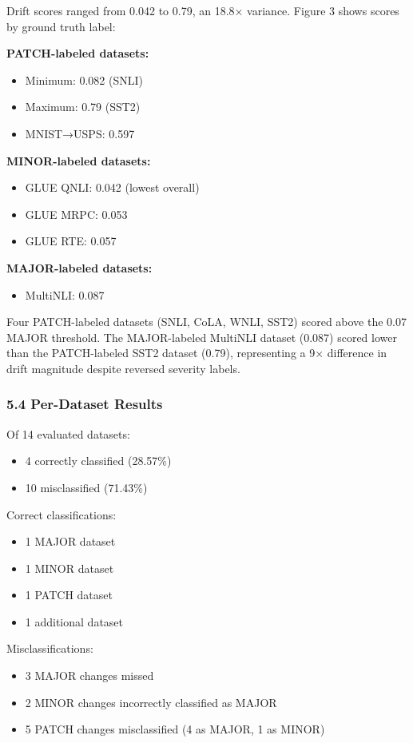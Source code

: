 Drift scores ranged from 0.042 to 0.79, an 18.8× variance. Figure 3 shows scores by ground truth label:

\textbf{PATCH-labeled datasets:}
\begin{itemize}
\item Minimum: 0.082 (SNLI)
\item Maximum: 0.79 (SST2)
\item MNIST→USPS: 0.597
\end{itemize}

\textbf{MINOR-labeled datasets:}
\begin{itemize}
\item GLUE QNLI: 0.042 (lowest overall)
\item GLUE MRPC: 0.053
\item GLUE RTE: 0.057
\end{itemize}

\textbf{MAJOR-labeled datasets:}
\begin{itemize}
\item MultiNLI: 0.087
\end{itemize}

Four PATCH-labeled datasets (SNLI, CoLA, WNLI, SST2) scored above the 0.07 MAJOR threshold. The MAJOR-labeled MultiNLI dataset (0.087) scored lower than the PATCH-labeled SST2 dataset (0.79), representing a 9× difference in drift magnitude despite reversed severity labels.

\subsubsection{5.4 Per-Dataset Results}

Of 14 evaluated datasets:
\begin{itemize}
\item 4 correctly classified (28.57\%)
\item 10 misclassified (71.43\%)
\end{itemize}

Correct classifications:
\begin{itemize}
\item 1 MAJOR dataset
\item 1 MINOR dataset
\item 1 PATCH dataset
\item 1 additional dataset
\end{itemize}

Misclassifications:
\begin{itemize}
\item 3 MAJOR changes missed
\item 2 MINOR changes incorrectly classified as MAJOR
\item 5 PATCH changes misclassified (4 as MAJOR, 1 as MINOR)
\end{itemize}

